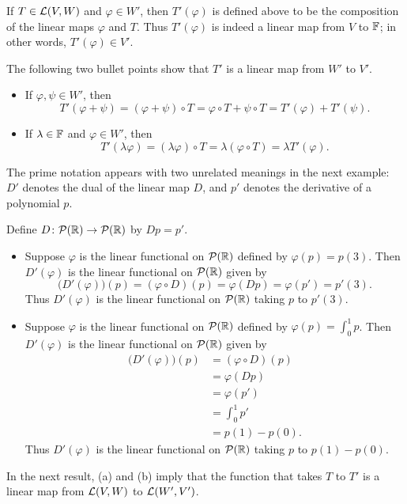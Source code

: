 If $T\in\mathcal{L}(V,W)$ and $\varphi\in W'$, then $T'(\varphi)$ is defined above to be
the composition of the linear maps $\varphi$ and $T$. Thus $T'(\varphi)$ is
indeed a linear map from $V$ to $\mathbb{F}$; in other words, $T'(\varphi)\in V'$.

The following two bullet points show that $T'$ is a linear map from $W'$ to
$V'$.
\begin{itemize}
\item If $\varphi,\psi\in W'$, then
  \[ T'(\varphi+\psi) = (\varphi+\psi)\circ T = \varphi\circ T+\psi\circ T
     = T'(\varphi)+T'(\psi). \]
\item If $\lambda\in\mathbb{F}$ and $\varphi\in W'$, then
  \[ T'(\lambda\varphi) = (\lambda\varphi)\circ T = \lambda(\varphi\circ T)
     = \lambda T'(\varphi). \]
\end{itemize}

The prime notation appears with two unrelated meanings in the next example: $D'$
denotes the dual of the linear map $D$, and $p'$ denotes the derivative of a
polynomial $p$.

\begin{example}\label{ax:3.119}
Define $D\colon\mathcal{P}(\mathbb{R})\to\mathcal{P}(\mathbb{R})$ by $Dp=p'$.
\begin{itemize}
\item Suppose $\varphi$ is the linear functional on $\mathcal{P}(\mathbb{R})$ defined by
  $\varphi(p)=p(3)$. Then $D'(\varphi)$ is the linear functional on $\mathcal{P}(\mathbb{R})$
  given by
  \[ \bigl(D'(\varphi)\bigr)(p) = (\varphi\circ D)(p) = \varphi(Dp)
     = \varphi(p') = p'(3). \]
  Thus $D'(\varphi)$ is the linear functional on $\mathcal{P}(\mathbb{R})$ taking $p$ to
  $p'(3)$.
\item Suppose $\varphi$ is the linear functional on $\mathcal{P}(\mathbb{R})$ defined by
  $\varphi(p)=\int_0^1p$. Then $D'(\varphi)$ is the linear functional on
  $\mathcal{P}(\mathbb{R})$ given by
  \begin{align*}
  \bigl(D'(\varphi)\bigr)(p) &= (\varphi\circ D)(p)\\
    &= \varphi(Dp)\\
    &= \varphi(p')\\
    &= \int_0^1 p'\\
    &= p(1)-p(0).
  \end{align*}
  Thus $D'(\varphi)$ is the linear functional on $\mathcal{P}(\mathbb{R})$ taking $p$ to
  $p(1)-p(0)$.
\end{itemize}
\end{example}

In the next result, (a) and (b) imply that the function that takes $T$ to $T'$
is a linear map from $\mathcal{L}(V,W)$ to $\mathcal{L}(W',V')$.

